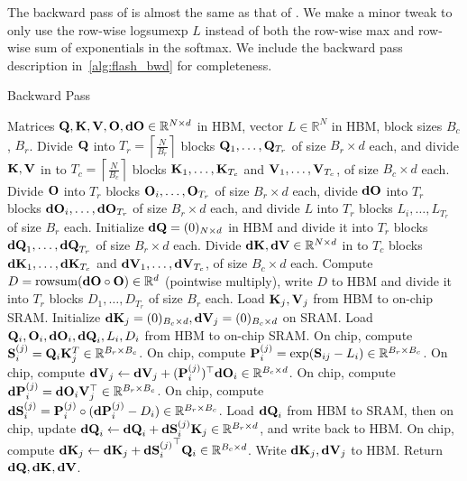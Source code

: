 The backward pass of \sysname is almost the same as that of \sysnameone. We make
a minor tweak to only use the row-wise logsumexp $L$ instead of both the
row-wise max and row-wise sum of exponentials in the softmax.
We include the backward pass description in~\cref{alg:flash_bwd} for completeness.
\begin{algorithm}[h]
  \caption{\small\label{alg:flash_bwd}\sysname Backward Pass}
  \begin{algorithmic}[1]
    \REQUIRE Matrices $\mathbf{Q}, \mathbf{K}, \mathbf{V}, \mathbf{O}, \mathbf{dO} \in \mathbb{R}^{N \times d}$ in HBM,
    vector $L \in \mathbb{R}^N$ in HBM, block sizes $B_c$, $B_r$.
    \STATE Divide $\mathbf{Q}$ into $T_r = \left\lceil\frac{N}{B_r} \right\rceil$ blocks $\mathbf{Q}_1, \dots, \mathbf{Q}_{T_r}$ of size $B_r \times d$ each,
    and divide $\mathbf{K}, \mathbf{V}$ in to $T_c = \left\lceil \frac{N}{B_c} \right\rceil$ blocks $\mathbf{K}_1, \dots, \mathbf{K}_{T_c}$ and
    $\mathbf{V}_1, \dots, \mathbf{V}_{T_c}$, of size $B_c \times d$ each.
    \STATE Divide $\mathbf{O}$ into $T_r$ blocks $\mathbf{O}_i, \dots, \mathbf{O}_{T_r}$ of size
    $B_r \times d$ each, divide $\mathbf{dO}$ into $T_r$ blocks $\mathbf{dO}_i, \dots, \mathbf{dO}_{T_r}$
    of size $B_r \times d$ each, and divide $L$ into $T_r$ blocks $L_i, \dots, L_{T_r}$ of size
    $B_r$ each.
    \STATE Initialize $\mathbf{dQ} = (0)_{N \times d}$ in HBM and divide it into $T_r$ blocks $\mathbf{dQ}_1, \dots, \mathbf{dQ}_{T_r}$ of size $B_r \times d$ each.
    Divide $\mathbf{dK}, \mathbf{dV} \in \mathbb{R}^{N \times d}$ in to $T_c$ blocks $\mathbf{dK}_1, \dots, \mathbf{dK}_{T_c}$ and
    $\mathbf{dV}_1, \dots, \mathbf{dV}_{T_c}$, of size $B_c \times d$ each.
    \STATE Compute $D = \mathrm{rowsum}(\mathbf{dO} \circ \mathbf{O}) \in \mathbb{R}^d$ (pointwise multiply), write
    $D$ to HBM and divide it into $T_r$ blocks $D_1, \dots, D_{T_r}$ of size
    $B_r$ each.
      \STATE Load $\mathbf{K}_j, \mathbf{V}_j$ from HBM to on-chip SRAM.
      \STATE Initialize $\mathbf{dK}_j = (0)_{B_c \times d}, \mathbf{dV}_j = (0)_{B_c \times d}$ on SRAM.
        \STATE Load $\mathbf{Q}_i, \mathbf{O}_i, \mathbf{dO}_i, \mathbf{dQ}_i, L_i, D_i$ from HBM to on-chip SRAM.
        \STATE On chip, compute $\mathbf{S}_{i}^{(j)} = \mathbf{Q}_i \mathbf{K}_j^T \in \mathbb{R}^{B_r \times B_c}$.
        \STATE On chip, compute $\mathbf{P}_{i}^{(j)} = \exp(\mathbf{S}_{ij} - L_{i}) \in \mathbb{R}^{B_r \times B_c}$.
        \STATE On chip, compute
        $\mathbf{dV}_j \leftarrow \mathbf{dV}_j + (\mathbf{P}_{i}^{(j)})^\top \mathbf{dO}_i \in \mathbb{R}^{B_c \times d}$.
        \STATE On chip, compute
        $\mathbf{dP}_{i}^{(j)} = \mathbf{dO}_{i} \mathbf{V}_j^\top \in \mathbb{R}^{B_r \times B_c}$.
        \STATE On chip, compute $\mathbf{dS}_{i}^{(j)} = \mathbf{P}_{i}^{(j)} \circ (\mathbf{dP}_{i}^{(j)} - D_i) \in \mathbb{R}^{B_r \times B_c}$.
        \STATE Load $\mathbf{dQ}_i$ from HBM to SRAM, then on chip, update
        $\mathbf{dQ}_{i} \leftarrow \mathbf{dQ}_i + \mathbf{dS}_{i}^{(j)} \mathbf{K}_j \in \mathbb{R}^{B_r \times d}$, and write
        back to HBM.
        \STATE On chip, compute $\mathbf{dK}_{j} \leftarrow \mathbf{dK}_j + {\mathbf{dS}_{i}^{(j)}}^\top \mathbf{Q}_i \in \mathbb{R}^{B_c \times d}$.
      \ENDFOR
      \STATE Write $\mathbf{dK}_j, \mathbf{dV}_j$ to HBM.
    \ENDFOR
    \STATE Return $\mathbf{dQ}, \mathbf{dK}, \mathbf{dV}$.
  \end{algorithmic}
\end{algorithm}

